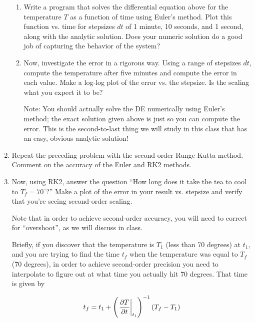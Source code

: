 \documentclass[12pt]{article}
\def\PAR#1#2{ {{\partial #1}\over{\partial #2}} }
\begin{document}
\begin{enumerate}
{\begin{enumerate}
\item{Write a program that solves the differential equation above for the temperature $T$ as a function of time using Euler's method. Plot this function vs. time for stepsizes $dt$ of 1 minute, 10 seconds, and 1 second, along
with the analytic solution. Does your numeric solution do a good job of capturing the behavior of the system?}

\item{Now, investigate the error in a rigorous way. Using a range of stepsizes $dt$, compute the temperature after five minutes and compute the error in each value. 
Make a log-log plot of the error vs. the stepsize. Is the scaling what you expect it to be?}

Note: You should actually solve the DE numerically using Euler's method; the exact solution given above is just so you can compute the error. This is the second-to-last thing we will study in this class that has an easy, obvious analytic solution!

\end{enumerate}
}

\item{Repeat the preceding problem with the second-order Runge-Kutta method. Comment on the accuracy of the Euler and RK2 methods.}

\item{Now, using RK2, answer the question ``How long does it take the tea to cool to $T_f=70^\circ$?'' Make a plot of the error in your result vs. stepsize and verify that you're seeing second-order scaling. 

Note that in order to achieve second-order accuracy, you will need to correct for ``overshoot'', as we will discuss in class. 

Briefly, if you discover that the temperature is $T_1$ (less than 70 degrees) at $t_1$, and you are trying to find the time $t_f$ when the temperature was equal to $T_f$ (70 degrees), in order to achieve second-order precision you need to interpolate to figure out at what time you actually hit 70 degrees. That time is given by

\begin{equation}
t_f = t_1 + \left(\left.\PAR{T}{t}\right|_{t_1}\right)^{-1} (T_f-T_1)
\end{equation}


}



\end{enumerate}
\end{document}
